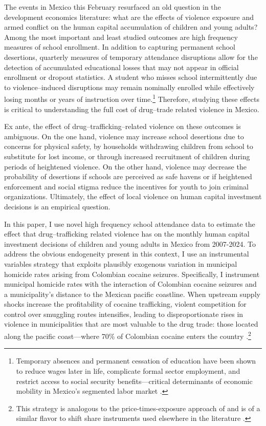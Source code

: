 \documentclass[12pt,letter,english,intoc,bibliography=totoc,index=totoc,BCOR10mm,captions=tableheading,nottitlepage,fleqn]{article}
\theoremstyle{break}
\begin{document}
The events in Mexico this February resurfaced an old question in the development economics literature: what are the effects of violence exposure and armed conflict on the human capital accumulation of children and young adults? Among the most important and least studied outcomes are high frequency measures of school enrollment. In addition to capturing permanent school desertions, quarterly measures of temporary attendance disruptions allow for the detection of accumulated educational losses that may not appear in official enrollment or dropout statistics. A student who misses school intermittently due to violence--induced disruptions may remain nominally enrolled while effectively losing months or years of instruction over time.\footnote{Temporary absences and permanent cessation of education have been shown to reduce wages later in life, complicate formal sector employment, and restrict access to social security benefits---critical determinants of economic mobility in Mexico's segmented labor market \citep{cattan2022, drager2024, dehoyos2014, harberger2012}.} Therefore, studying these effects is critical to understanding the full cost of drug--trade related violence in Mexico. 

Ex ante, the effect of drug--trafficking--related violence on these outcomes is ambiguous. On the one hand, violence may increase school desertions due to concerns for physical safety, by households withdrawing children from school to substitute for lost income, or through increased recruitment of children during periods of heightened violence. On the other hand, violence may decrease the probability of desertions if schools are perceived as safe havens or if heightened enforcement and social stigma reduce the incentives for youth to join criminal organizations. Ultimately, the effect of local violence on human capital investment decisions is an empirical question.

In this paper, I use novel high frequency school attendance data to estimate the effect that drug--trafficking related violence has on the monthly human capital investment decisions of children and young adults in Mexico from 2007-2024. To address the obvious endogeneity present in this context, I use an instrumental variables strategy that exploits plausibly exogenous variation in municipal homicide rates arising from Colombian cocaine seizures. Specifically, I instrument municipal homicide rates with the interaction of Colombian cocaine seizures and a municipality's distance to the Mexican pacific coastline. When upstream supply shocks increase the profitability of cocaine trafficking, violent competition for control over smuggling routes intensifies, leading to disproportionate rises in violence in municipalities that are most valuable to the drug trade: those located along the pacific coast---where 70\% of Colombian cocaine enters the country \citep{unodc2010}.\footnote{This strategy is analogous to the price-times-exposure approach of \citet{dubevargas} and is of a similar flavor to shift share instruments used elsewhere in the literature \citep{bartik1991}.}
\end{document}
